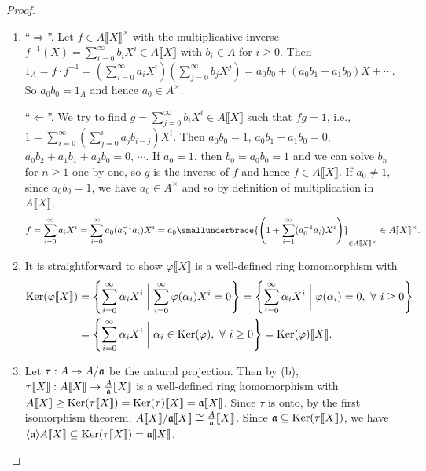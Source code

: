 \begin{proof}
    \begin{enumerate}
        \item 
            ``$\Rightarrow$''. Let $f \in A\llbracket X \rrbracket^\times$ with the multiplicative inverse $f^{-1}(X) = \sum_{i=0}^\infty b_iX^i \in A\llbracket X \rrbracket$ with $b_i \in A$ for $i \geq 0$. Then $1_A = f \cdot f^{-1} = (\sum_{i=0}^\infty a_iX^i)(\sum_{j=0}^\infty b_jX^j) = a_0b_0 + (a_0b_1 + a_1b_0)X + \cdots$. So $a_0b_0 = 1_A$ and hence $a_0 \in A^\times$. \par
            ``$\Leftarrow$''. We try to find $g = \sum_{j=0}^\infty b_iX^i \in A\llbracket X \rrbracket$ such that $fg = 1$, i.e., $1 = \sum_{i=0}^\infty (\sum_{j=0}^i a_jb_{i-j})X^i$. Then $a_0b_0 = 1$, $a_0b_1 + a_1b_0 = 0$, $a_0b_2 + a_1b_1 + a_2b_0= 0$, $\cdots$. If $a_0 = 1$, then $b_0 = a_0b_0 = 1$ and we can solve $b_n$ for $n \geq 1$ one by one, so $g$ is the inverse of $f$ and hence $f \in A\llbracket X \rrbracket$. If $a_0 \neq 1$, since $a_0b_0 = 1$, we have $a_0 \in A^\times $ and so by definition of multiplication in $A\llbracket X \rrbracket$,
            \[f = \sum_{i=0}^\infty a_iX^i = \sum_{i=0}^\infty a_0(a_0^{-1}a_i)X^i = a_0 \smallunderbrace{\left(1+\sum_{i=1}^\infty (a_0^{-1}a_i)X^i\right)}_{\in A\llbracket X \rrbracket^\times} \in A\llbracket X \rrbracket^\times.\]
        \item
            It is straightforward to show $\varphi \llbracket X \rrbracket$ is a well-defined ring homomorphism with
            \begin{align*}
                \operatorname{Ker}(\varphi \llbracket X \rrbracket) &= \left\{\sum_{i=0}^\infty \alpha_i X^i \mathrel{\bigg |} \sum_{i=0}^\infty \varphi(\alpha_i)X^i = 0 \right\} = \left\{\sum_{i=0}^\infty \alpha_i X^i \mathrel{\bigg |} \varphi(\alpha_i) = 0, \ \forall \  i \geq 0\right\} \\
                                                      &= \left\{\sum_{i=0}^\infty \alpha_i X^i \mathrel{\bigg |} \alpha_i \in \operatorname{Ker}(\varphi), \ \forall \  i \geq 0 \right\} = \operatorname{Ker}(\varphi)\llbracket X \rrbracket.
            \end{align*}
        \item 
            Let $\tau: A \twoheadrightarrow A/\mathfrak{a}$ be the natural projection. Then by (b), $\tau \llbracket X \rrbracket: A\llbracket X \rrbracket \to \frac{A}{\mathfrak{a}}\llbracket X \rrbracket$ is a well-defined ring homomorphism with $A\llbracket X \rrbracket \geq \operatorname{Ker}(\tau \llbracket X \rrbracket) = \operatorname{Ker}(\tau) \llbracket X \rrbracket = \mathfrak{a} \llbracket X \rrbracket$. Since $\tau$ is onto, by the first isomorphism theorem, $A\llbracket X \rrbracket / \mathfrak{a} \llbracket X \rrbracket \cong \frac{A}{\mathfrak{a}}\llbracket X \rrbracket$. Since $\mathfrak{a} \subseteq \operatorname{Ker}(\tau \llbracket X \rrbracket)$, we have $\langle \mathfrak{a} \rangle A \llbracket X \rrbracket \subseteq \operatorname{Ker}(\tau \llbracket X \rrbracket) = \mathfrak{a} \llbracket X \rrbracket$. \par

\end{enumerate}
\end{proof}
